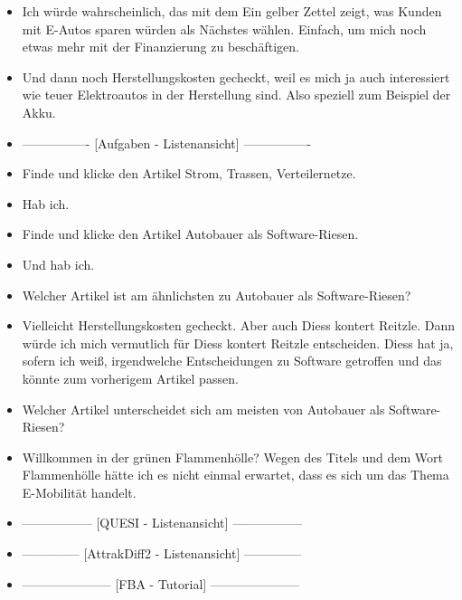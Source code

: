 {\begin{itemize}[]
                  Und als Interessierter würde ich natürlich auch am Thema Finanzierung für mein Elektroauto interessiert sein.
            \item {} Ich würde wahrscheinlich, das mit dem \flqq Ein gelber Zettel zeigt, was Kunden mit E-Autos sparen würden\frqq{} als Nächstes wählen.
                  Einfach, um mich noch etwas mehr mit der Finanzierung zu beschäftigen.
            \item {} Und dann noch \flqq Herstellungskosten\frqq{} gecheckt, weil es mich ja auch interessiert wie teuer Elektroautos in der Herstellung sind.
                  Also speziell zum Beispiel der Akku.
            \item {----------------} [Aufgaben - Listenansicht] {----------------}
            \item {} Finde und klicke den Artikel \flqq Strom, Trassen, Verteilernetze\frqq{}.
            \item {} Hab ich.
            \item {} Finde und klicke den Artikel \flqq Autobauer als Software-Riesen\frqq{}.
            \item {} Und hab ich.
            \item {} Welcher Artikel ist am ähnlichsten zu \flqq Autobauer als Software-Riesen\frqq{}?
            \item {} Vielleicht \flqq Herstellungskosten gecheckt\frqq{}.
                  Aber auch \flqq Diess kontert Reitzle\frqq{}.
                  Dann würde ich mich vermutlich für \flqq Diess kontert Reitzle\frqq{} entscheiden.
                  Diess hat ja, sofern ich weiß, irgendwelche Entscheidungen zu Software getroffen und das könnte zum vorherigem Artikel passen.
            \item {} Welcher Artikel unterscheidet sich am meisten von \flqq Autobauer als Software-Riesen\frqq{}?
            \item {} \flqq Willkommen in der grünen Flammenhölle\frqq{}?
                  Wegen des Titels und dem Wort Flammenhölle hätte ich es nicht einmal erwartet, dass es sich um das Thema E-Mobilität handelt.
            \item {-----------------} [QUESI - Listenansicht] {-----------------}
            \item {--------------} [AttrakDiff2 - Listenansicht] {--------------}
            \item {---------------------} [FBA - Tutorial] {---------------------}

\end{itemize}}
